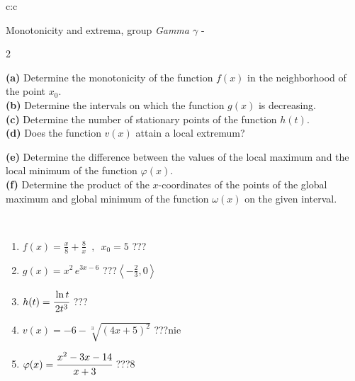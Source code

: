 \documentclass[10pt]{report}
\begin{document}
\begin{tabular}{c:c}
\begin{minipage}[c][104.5mm][t]{0.5\linewidth}
\begin{center}
\vspace{5mm}
{\huge Monotonicity and extrema, group \textit{Gamma $\gamma$} -}\\[5mm]
\begin{minipage}{0.95\linewidth}
\begin{center}
{\small \begin{multicols}{2} \raggedright
\textbf{(a)} Determine the monotonicity of the function \(f(x)\) in the neighborhood of the point \(x_0\). \\[1mm]
\textbf{(b)} Determine the intervals on which the function \(g(x)\) is decreasing. \\[1mm]
\textbf{(c)} Determine the number of stationary points of the function \(h(t)\). \\[1mm]
\textbf{(d)} Does the function \(v(x)\) attain a local extremum? \par \columnbreak
\textbf{(e)} Determine the difference between the values of the local maximum and the local minimum of the function \(\varphi(x)\). \\[1mm]
\textbf{(f)} Determine the product of the \(x\)-coordinates of the points of the global maximum and global minimum of the function \(\omega(x)\) on the given interval. \\[1mm]
\end{multicols}
}
\end{center}
\end{minipage}
\\[1mm]
\begin{minipage}{0.79\linewidth}
\begin{center}
\begin{varwidth}{\linewidth}
\setlength{\itemsep}{0pt}
\begin{enumerate}
\normalsize
\item $f(x)=\frac{x}{8}+\frac{8}{x} \enspace , \enspace x_0=5$\quad \dotfill\; ???\;\dotfill \quad {}
\item $g(x)=x^2\, e^{3x-6}$\quad \dotfill\; ???\;\dotfill \quad $\left\langle-\frac{2}{3} , 0\right\rangle$
\item $h(t)=\cfrac{\ln t}{2t^3}$\quad \dotfill\; ???\;\dotfill {}
\item $v(x)=-6-\sqrt[3]{(4x+5)^2}$\quad \dotfill\; ???\;\dotfill \quad $\text{nie}$
\item $\varphi(x)=\cfrac{x^2-3x-14}{x+3}$\quad \dotfill\; ???\;\dotfill \quad $8$

\end{enumerate}
\end{varwidth}
\end{center}
\end{minipage}
\end{center}
\end{minipage}
\end{tabular}
\end{document}
